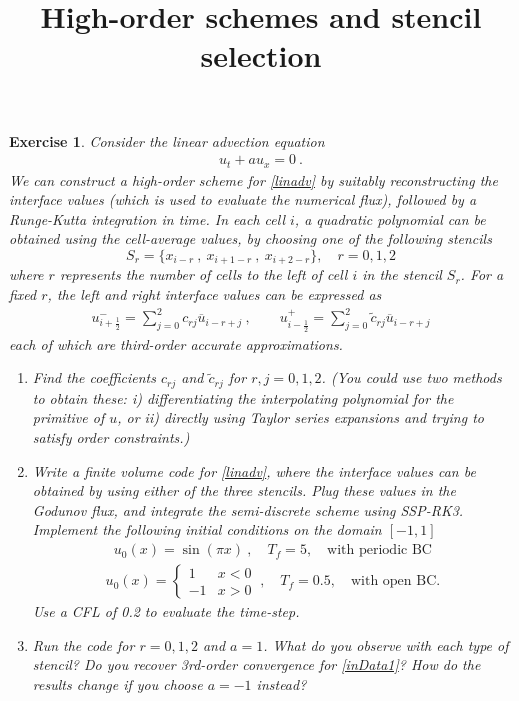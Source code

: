 \documentclass[10pt,letterpaper]{article}
\newcommand{\iph}{{i + \frac{1}{2}}}
\newcommand{\imh}{{i - \frac{1}{2}}}
\theoremstyle{break}
\newtheorem{exercise}{Exercise}
\begin{document}
\title{High-order schemes and stencil selection}
\date{}

\maketitle


\begin{exercise}
	Consider the linear advection equation
	\begin{gather} \label{linadv}
		u_t + a u_x = 0\ .
	\end{gather}%
	We can construct a high-order scheme for \eqref{linadv} by suitably reconstructing the interface values (which is used to evaluate the numerical flux),
	followed by a Runge-Kutta integration in time.
	In each cell $i$, a quadratic polynomial can be obtained using the cell-average values,
	by choosing one of the following stencils
	\[
		S_r = \{x_{i-r}\ , \ x_{i+1-r}\ , \ x_{i+2-r} \}, \quad r = 0,1,2
	\]
	where $r$ represents the number of cells to the left of cell $i$ in the stencil $S_r$. For a fixed $r$, the left and right interface values can be expressed as
	\begin{gather} \label{rec}
	u_\iph^- = \sum \limits_{j=0}^2 c_{rj} \overline{u}_{i-r+j}\ , \qquad  u_\imh^+ = \sum \limits_{j=0}^2 \tilde{c}_{rj} \overline{u}_{i-r+j}
	\end{gather}%
	each of which are third-order accurate approximations. 


	\begin{enumerate}
		\item 
		Find the coefficients ${c}_{rj}$ and $\tilde{c}_{rj}$ for $r,j = 0,1,2$. (You could use two methods to obtain these: i) differentiating the interpolating polynomial for the primitive of $u$, or ii) directly using Taylor series expansions and trying to satisfy order constraints.)

		\item Write a finite volume code for \eqref{linadv}, where the interface values can be obtained by using either of the three stencils. Plug these values in the Godunov flux, and integrate the semi-discrete scheme using SSP-RK3. Implement the following initial conditions on the domain $[-1,1]$
		\begin{gather} \label{inData1}
			u_0(x)=\sin(\pi x)\ ,  
			\quad
			T_f = 5, \quad \text{with periodic BC}
		\end{gather}%
		\begin{gather} \label{inData2}
			u_0(x)=\begin{cases}
				1 & x<0\\
				-1 & x>0
			\end{cases}\ ,
			\quad
			T_f = 0.5, \quad \text{with open BC}.
		\end{gather}%
		Use a CFL of 0.2 to evaluate the time-step. 

		\item
		Run the code for $r=0,1,2$ and $a=1$. What do you observe with each type of stencil? Do you recover 3rd-order convergence for \eqref{inData1}? How do the results change if you choose $a=-1$ instead?
	\end{enumerate}
\end{exercise}
\end{document}
